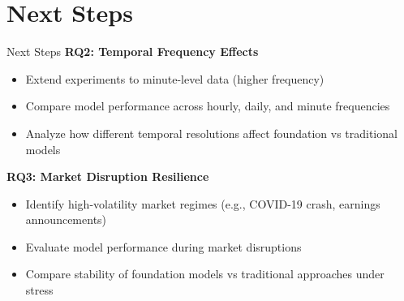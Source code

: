 \documentclass[aspectratio=169]{beamer}
\begin{document}
\section{Next Steps}

\begin{frame}{Next Steps}
\textbf{RQ2: Temporal Frequency Effects}
\begin{itemize}
\item Extend experiments to minute-level data (higher frequency)
\item Compare model performance across hourly, daily, and minute frequencies
\item Analyze how different temporal resolutions affect foundation vs traditional models
\end{itemize}

\vspace{1em}

\textbf{RQ3: Market Disruption Resilience}
\begin{itemize}
\item Identify high-volatility market regimes (e.g., COVID-19 crash, earnings announcements)
\item Evaluate model performance during market disruptions
\item Compare stability of foundation models vs traditional approaches under stress
\end{itemize}


\end{frame}


\end{document}
